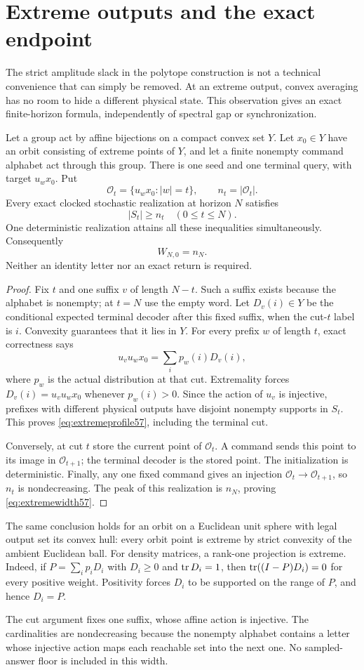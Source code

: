 \section{Extreme outputs and the exact endpoint}\label{sec:extreme57}
The strict amplitude slack in the polytope construction is not a technical
convenience that can simply be removed. At an extreme output, convex
averaging has no room to hide a different physical state. This observation
gives an exact finite-horizon formula, independently of spectral gap or
synchronization.

\begin{theorem}\label{thm:extreme57}
Let a group act by affine bijections on a compact convex set $Y$. Let
$x_0\in Y$ have an orbit consisting of extreme points of $Y$, and let a
finite nonempty command alphabet act through this group. There is one seed
and one terminal query, with target $u_w x_0$. Put
\[
 \mathcal O_t=\{u_wx_0:|w|=t\},\qquad n_t=|\mathcal O_t|.
\]
Every exact clocked stochastic realization at horizon $N$ satisfies
\begin{equation}\label{eq:extremeprofile57}
                         |S_t|\ge n_t\quad(0\le t\le N).
\end{equation}
One deterministic realization attains all these inequalities simultaneously.
Consequently
\begin{equation}\label{eq:extremewidth57}
                         W_{N,0}=n_N.
\end{equation}
Neither an identity letter nor an exact return is required.
\end{theorem}
\begin{proof}
Fix $t$ and one suffix $v$ of length $N-t$. Such a suffix exists because the
alphabet is nonempty; at $t=N$ use the empty word. Let $D_v(i)\in Y$ be the
conditional expected terminal decoder after this fixed suffix, when the
cut-$t$ label is $i$. Convexity guarantees that it lies in $Y$. For every
prefix $w$ of length $t$, exact correctness says
\[
             u_vu_wx_0=\sum_i p_w(i)D_v(i),
\]
where $p_w$ is the actual distribution at that cut. Extremality forces
$D_v(i)=u_vu_wx_0$ whenever $p_w(i)>0$. Since the action of $u_v$ is
injective, prefixes with different physical outputs have disjoint
nonempty supports in $S_t$. This proves \eqref{eq:extremeprofile57}, including
the terminal cut.

Conversely, at cut $t$ store the current point of $\mathcal O_t$. A command
sends this point to its image in $\mathcal O_{t+1}$; the terminal decoder is
the stored point. The initialization is deterministic. Finally, any one
fixed command gives an injection $\mathcal O_t\to\mathcal O_{t+1}$, so $n_t$
is nondecreasing. The peak of this realization is $n_N$, proving
\eqref{eq:extremewidth57}.
\end{proof}
The same conclusion holds for an orbit on a Euclidean unit sphere with
legal output set its convex hull: every orbit point is extreme by strict
convexity of the ambient Euclidean ball. For density matrices, a rank-one
projection is extreme. Indeed, if $P=\sum_i p_iD_i$ with $D_i\ge0$ and
$\operatorname{tr} D_i=1$, then $\operatorname{tr}((I-P)D_i)=0$ for every positive weight. Positivity
forces $D_i$ to be supported on the range of $P$, and hence $D_i=P$.


The cut argument fixes one suffix, whose affine action is injective.
The cardinalities are nondecreasing because the nonempty alphabet
contains a letter whose injective action maps each reachable set into
the next one. No sampled-answer floor is included in this width.
